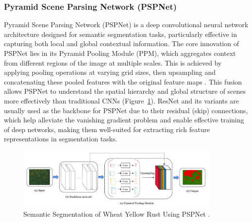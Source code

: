\subsubsection{Pyramid Scene Parsing Network (PSPNet)}
Pyramid Scene Parsing Network (PSPNet) is a deep convolutional neural network architecture designed for semantic segmentation tasks, particularly effective in capturing both local and global contextual information. The core innovation of PSPNet lies in its Pyramid Pooling Module (PPM), which aggregates context from different regions of the image at multiple scales. This is achieved by applying pooling operations at varying grid sizes, then upsampling and concatenating these pooled features with the original feature maps \parencite{pan2021deep}. This fusion allows PSPNet to understand the spatial hierarchy and global structure of scenes more effectively than traditional CNNs (Figure~\ref{fig:PSPNet}). ResNet and its variants are usually used as the backbone for PSPNet due to their residual (skip) connections, which help alleviate the vanishing gradient problem and enable effective training of deep networks, making them well-suited for extracting rich feature representations in segmentation tasks.
\begin{figure}[H] %
    \centering
    \includegraphics[width=0.9\textwidth]{chapters/chapter1/images/Figure20.png}
    \caption{Semantic Segmentation of Wheat Yellow Rust Using PSPNet \parencite{pan2021deep}.}
    \label{fig:PSPNet}
\end{figure}


